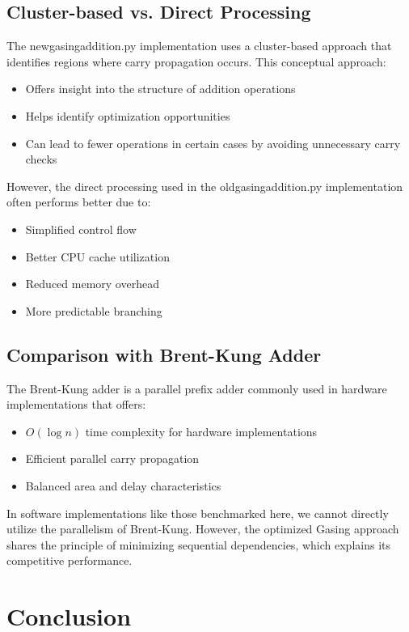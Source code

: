\documentclass{article}
\begin{document}
\subsection{Cluster-based vs. Direct Processing}
The newgasingaddition.py implementation uses a cluster-based approach that identifies regions where carry propagation occurs. This conceptual approach:

\begin{itemize}
    \item Offers insight into the structure of addition operations
    \item Helps identify optimization opportunities
    \item Can lead to fewer operations in certain cases by avoiding unnecessary carry checks
\end{itemize}

However, the direct processing used in the oldgasingaddition.py implementation often performs better due to:
\begin{itemize}
    \item Simplified control flow
    \item Better CPU cache utilization
    \item Reduced memory overhead
    \item More predictable branching
\end{itemize}

\subsection{Comparison with Brent-Kung Adder}
The Brent-Kung adder is a parallel prefix adder commonly used in hardware implementations that offers:
\begin{itemize}
    \item $O(\log n)$ time complexity for hardware implementations
    \item Efficient parallel carry propagation
    \item Balanced area and delay characteristics
\end{itemize}

In software implementations like those benchmarked here, we cannot directly utilize the parallelism of Brent-Kung. However, the optimized Gasing approach shares the principle of minimizing sequential dependencies, which explains its competitive performance.

\section{Conclusion}
\end{document}
